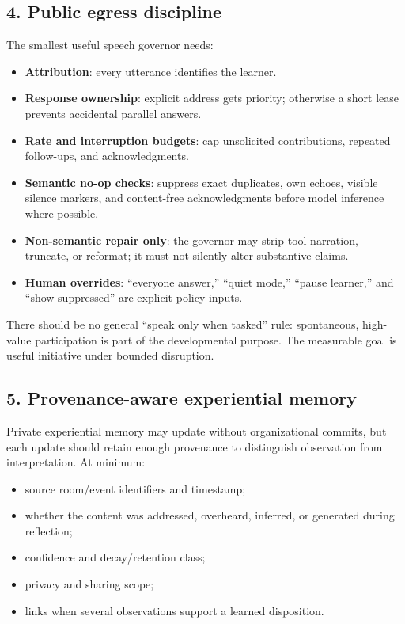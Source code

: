 \documentclass[11pt]{article}
\begin{document}
\subsection{4. Public egress discipline}

The smallest useful speech governor needs:

\begin{itemize}
  \item \textbf{Attribution}: every utterance identifies the learner.
  \item \textbf{Response ownership}: explicit address gets priority; otherwise
  a short lease prevents accidental parallel answers.
  \item \textbf{Rate and interruption budgets}: cap unsolicited contributions,
  repeated follow-ups, and acknowledgments.
  \item \textbf{Semantic no-op checks}: suppress exact duplicates, own echoes,
  visible silence markers, and content-free acknowledgments before model
  inference where possible.
  \item \textbf{Non-semantic repair only}: the governor may strip tool
  narration, truncate, or reformat; it must not silently alter substantive
  claims.
  \item \textbf{Human overrides}: ``everyone answer,'' ``quiet mode,'' ``pause
  learner,'' and ``show suppressed'' are explicit policy inputs.
\end{itemize}

There should be no general ``speak only when tasked'' rule: spontaneous,
high-value participation is part of the developmental purpose. The measurable
goal is useful initiative under bounded disruption.

\subsection{5. Provenance-aware experiential memory}

Private experiential memory may update without organizational commits, but
each update should retain enough provenance to distinguish observation from
interpretation. At minimum:

\begin{itemize}
  \item source room/event identifiers and timestamp;
  \item whether the content was addressed, overheard, inferred, or generated
  during reflection;
  \item confidence and decay/retention class;
  \item privacy and sharing scope;
  \item links when several observations support a learned disposition.
\end{itemize}
\end{document}
